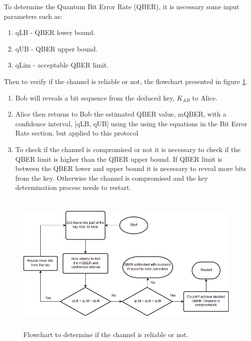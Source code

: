	To determine the Quantum Bit Error Rate (QBER), it is necessary some input parameters such as:
	
	\begin{enumerate}
		\item qLB - QBER lower bound.
		\item qUB - QBER upper bound.
		\item qLim - acceptable QBER limit.
	\end{enumerate}

	Then to verify if the channel is reliable or not, the flowchart presented in figure \ref{fig:flowQber}.
	
	\begin{enumerate}
		\item Bob will reveals a bit sequence from the deduced key, $K_{AB}$ to Alice.
		\item Alice then returns to Bob the estimated QBER value, mQBER, with a confidence interval, [qLB, qUB] using the using the equations in the Bit Error Rate section, but applied to this protocol
		\item To check if the channel is compromised or not it is necessary to check if the QBER limit is higher than the QBER upper bound. If QBER limit is between the QBER lower and upper bound it is necessary to reveal more bits from the key. Otherwise the channel is compromised and the key determination process needs to restart.
	\end{enumerate}
	
	
\begin{figure}[H]
	\centering
	\includegraphics[width=1\textwidth,height=7cm]{./sdf/bb84_with_discrete_variables/figures/qberEstimation.png}
	\caption{Flowchart to determine if the channel is reliable or not.}\label{fig:flowQber}
\end{figure}



